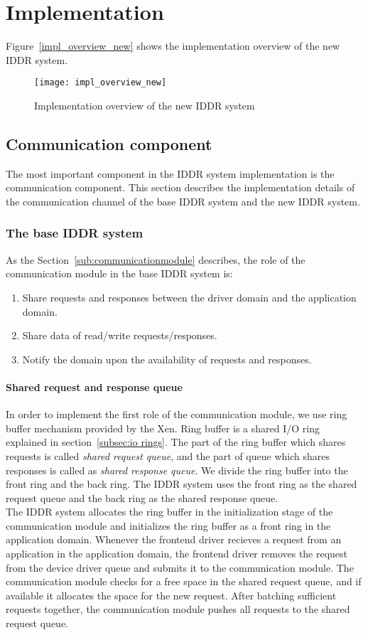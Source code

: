 \section{Implementation}

Figure~\ref{impl_overview_new} shows the implementation overview of the new IDDR system.

\begin{figure}[!ht]
\centering
\texttt{[image: impl\_overview\_new]}
\caption{Implementation overview of the new IDDR system}
\label{fig:Implementation overview}
\end{figure}

\subsection{Communication component}
The most important component in the IDDR system implementation is the communication component. This section describes the implementation details of the communication channel of the base IDDR system and the new IDDR system. 
\subsubsection*{The base IDDR system}
As the Section~\ref{sub:communicationmodule} describes, the role of the communication module in the base IDDR system is:
\begin{enumerate} 
\item Share requests and responses between the driver domain and the application domain.
\item Share data of read/write requests/responses.
\item Notify the domain upon the availability of requests and responses. 
\end{enumerate}
\paragraph{Shared request and response queue}
In order to implement the first role of the communication module, we use ring buffer mechanism provided by the Xen. Ring buffer is a shared I/O ring explained in section~\ref{subsec:io rings}. The part of the ring buffer which shares requests is called \textit{shared request queue}, and the part of queue which shares responses is called as \textit{shared response queue}. We divide the ring buffer into the front ring and the back ring. The IDDR system uses the front ring as the shared request queue and the back ring as the shared response queue. 
\\[3mm]
The IDDR system allocates the ring buffer in the initialization stage of the communication module and initializes the ring buffer as a front ring in the application domain. Whenever the frontend driver recieves a request from an application in the application domain, the frontend driver removes the request from the device driver queue and submits it to the communication module. The communication module checks for a free space in the shared request queue, and if available it allocates the space for the new request. After batching sufficient requests together, the communication module pushes all requests to the shared request queue.

